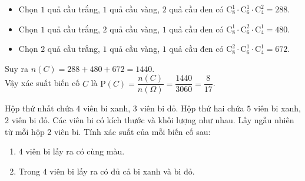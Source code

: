 \begin{bt}
{\begin{enumerate}
			\begin{itemize}
				\item Chọn $1$ quả cầu trắng, $1$ quả cầu vàng, $2$ quả cầu đen có $\mathrm{C}_8^1\cdot \mathrm{C}_6^1\cdot\mathrm{C}_4^2=288$.
				\item Chọn $1$ quả cầu trắng, $2$ quả cầu vàng, $1$ quả cầu đen có $\mathrm{C}_8^1\cdot \mathrm{C}_6^2\cdot\mathrm{C}_4^1=480$.
				\item Chọn $2$ quả cầu trắng, $1$ quả cầu vàng, $1$ quả cầu đen có $\mathrm{C}_8^2\cdot \mathrm{C}_6^1\cdot\mathrm{C}_4^1=672$.
			\end{itemize}
			Suy ra $n(C)=288+480+672=1440$.\\
			Vậy xác suất biến cố $C$ là $\mathrm{P}(C)=\dfrac{n(C)}{n(\Omega)}=\dfrac{1440}{3060}=\dfrac{8}{17}$.
		\end{enumerate}
	}
\end{bt}

\begin{bt}%
 Hộp thứ nhất chứa $4$ viên bi xanh, $3$ viên bi đỏ. Hộp thứ hai chứa $5$ viên bi xanh, $2$ viên bi đỏ. Các viên bi có kích thước và khối lượng như nhau. Lấy ngẫu nhiên từ mỗi hộp 2 viên bi. Tính xác suất của mỗi biến cố sau:
 \begin{enumerate}
 	\item $4$ viên bi lấy ra có cùng màu.
 	\item Trong $4$ viên bi lấy ra có đủ cả bi xanh và bi đỏ.
 \end{enumerate}
\end{bt}

